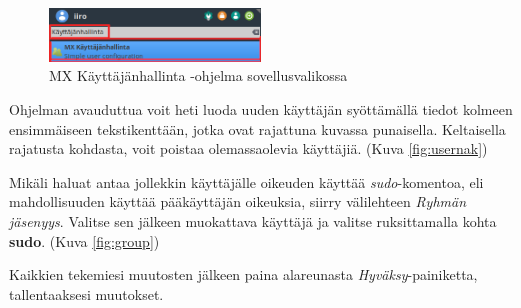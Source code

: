 \documentclass[a4paper, 12pt, finnish]{article}
\begin{document}
\begin{figure}[htpb]
    \begin{center}
        \includegraphics[width=0.5\textwidth]{user/set}
        \caption{MX Käyttäjänhallinta -ohjelma sovellusvalikossa}
        \label{fig:hallinta}
    \end{center}
\end{figure}

Ohjelman avauduttua voit heti luoda uuden käyttäjän syöttämällä tiedot kolmeen ensimmäiseen tekstikenttään, jotka ovat rajattuna kuvassa punaisella. Keltaisella rajatusta kohdasta, voit poistaa olemassaolevia käyttäjiä. (Kuva \ref{fig:usernak})

Mikäli haluat antaa jollekkin käyttäjälle oikeuden käyttää \textit{sudo}-komentoa, eli mahdollisuuden käyttää pääkäyttäjän oikeuksia, siirry välilehteen \textit{Ryhmän jäsenyys}. Valitse sen jälkeen muokattava käyttäjä ja valitse ruksittamalla kohta \textbf{sudo}. (Kuva \ref{fig:group})

Kaikkien tekemiesi muutosten jälkeen paina alareunasta \textit{Hyväksy}-painiketta, tallentaaksesi muutokset.
\end{document}
